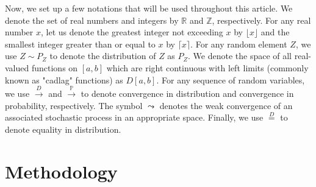 \documentclass[11pt]{article}
\theoremstyle{plain}
\theoremstyle{definition}
\theoremstyle{remark}
\begin{document}
\indent Now, we set up a few notations that will be used throughout this article. We denote the set of real numbers and integers by $\mathbb{R}$ and $\mathbb{Z}$, respectively. For any real number $x$, let us denote the greatest integer not exceeding $x$ by $\lfloor x \rfloor$ and the smallest integer greater than or equal to $x$ by $\lceil x \rceil$. For any random element $Z$, we use $Z\sim P_Z$ to denote the distribution of $Z$ as $P_Z$. We denote the space of all real-valued functions on $[a,b]$ which are right continuous with left limits (commonly known as "cadlag" functions) as $D[a,b]$. For any sequence of random variables, we use $\overset{D}{\to}$ and $\overset{\mathbb{P}}{\to}$ to denote convergence in distribution and convergence in probability, respectively. The symbol $\leadsto$ denotes the weak convergence of an associated stochastic process in an appropriate space. Finally, we use $\overset{D}{=}$ to denote equality in distribution.
\section{Methodology}
\label{sec:mathematical setups}
\end{document}

